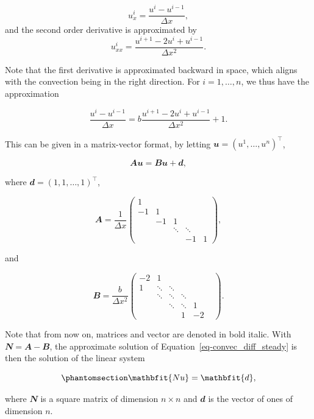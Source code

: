 \documentclass[
  letterpaper,
]{report}
\theoremstyle{definition}
\theoremstyle{plain}
\theoremstyle{definition}
\theoremstyle{remark}
\begin{document}
\[
    u_x^i = \frac{u^i - u^{i-1}}{\Delta x},
\] and the second order derivative is approximated by \[
    u^i_{xx} = \frac{u^{i+1} - 2u^i + u^{i-1}}{\Delta x ^2}.
\]

Note that the first derivative is approximated backward in space, which
aligns with the convection being in the right direction. For
\(i = 1 , \dots , n\), we thus have the approximation

\[
\frac{u^i - u^{i-1}}{\Delta x}  = b \frac{u^{i+1} - 2u^i + u^{i-1}}{\Delta x ^2} + 1.
\]

\vspace{3cm}

This can be given in a matrix-vector format, by letting
\(\mathbfit{u} = (u^1,\dots, u^{n})^\intercal\),

\[
    \mathbfit{Au} = \mathbfit{Bu}+\mathbfit{d},
\]

where \(\mathbfit{d} = (1,1,\dots , 1)^\intercal\),

\[
\mathbfit{A} = \frac{1}{\Delta x}\begin{pmatrix}
    1 &  &&&\\
    -1 & 1 &&\\
    & -1 & 1 &\\
    &&\ddots & \ddots &\\
    &&&-1& 1 
\end{pmatrix}, 
\]

and

\[
\mathbfit{B} =  \frac{b}{\Delta x ^2}\begin{pmatrix}
    -2 & 1 &&&\\
    1 & \ddots & \ddots &&\\
    & \ddots & \ddots & \ddots&\\
    && \ddots & \ddots & 1 &\\
    &&&1 & -2  
\end{pmatrix} .
\]

Note that from now on, matrices and vector are denoted in bold italic.
With \(\mathbfit{N} = \mathbfit{A}-\mathbfit{B}\), the approximate
solution of Equation~\ref{eq-convec_diff_steady} is then the solution of
the linear system

\begin{equation}\phantomsection\label{eq-UnscaledSystem}{
\mathbfit{Nu} = \mathbfit{d},
}\end{equation}

where \(\mathbfit{N}\) is a square matrix of dimension \(n \times n\)
and \(\mathbfit{d}\) is the vector of ones of dimension \(n\).
\end{document}
